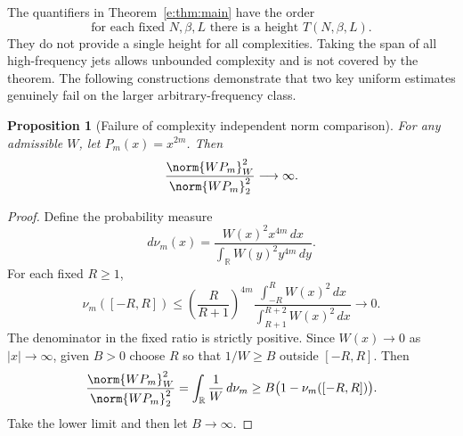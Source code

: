 \documentclass[11pt,a4paper]{article}
\numberwithin{equation}{section}
\newtheorem{proposition}[theorem]{Proposition}
\theoremstyle{definition}\newtheorem{definition}[theorem]{Definition}
\theoremstyle{remark}\newtheorem{remark}[theorem]{Remark}
\newcommand{\R}{\mathbb R}\newcommand{\C}{\mathbb C}\newcommand{\N}{\mathbb N}
\begin{document}
The quantifiers in Theorem~\ref{e:thm:main} have the order
\[
 \text{for each fixed }N,\beta,L\text{ there is a height }T(N,\beta,L).
\]
They do not provide a single height for all complexities. Taking the span
of all high-frequency jets allows unbounded complexity and is not covered
by the theorem. The following constructions demonstrate that two key
uniform estimates genuinely fail on the larger arbitrary-frequency class.

\begin{proposition}[Failure of complexity independent norm comparison]\label{e:prop:norm-counter}
For any admissible $W$, let $P_m(x)=x^{2m}$. Then
\begin{equation}\label{e:eq:norm-counter}
 \frac{\norm{WP_m}_W^2}{\norm{WP_m}_2^2}\longrightarrow\infty.
\end{equation}
\end{proposition}
\begin{proof}
Define the probability measure
\[
 d\nu_m(x)=\frac{W(x)^2x^{4m}\,dx}{\int_\R W(y)^2y^{4m}\,dy}.
\]
For each fixed $R\ge1$,
\[
 \nu_m([-R,R])\le
 \left(\frac R{R+1}\right)^{4m}
 \frac{\int_{-R}^R W(x)^2\,dx}{\int_{R+1}^{R+2}W(x)^2\,dx}
 \longrightarrow0.
\]
The denominator in the fixed ratio is strictly positive. Since
$W(x)\to0$ as $|x|\to\infty$, given $B>0$ choose $R$ so that
$1/W\ge B$ outside $[-R,R]$. Then
\[
 \frac{\norm{WP_m}_W^2}{\norm{WP_m}_2^2}
 =\int_\R\frac1W\,d\nu_m
 \ge B\bigl(1-\nu_m([-R,R])\bigr).
\]
Take the lower limit and then let $B\to\infty$.
\end{proof}
\end{document}
